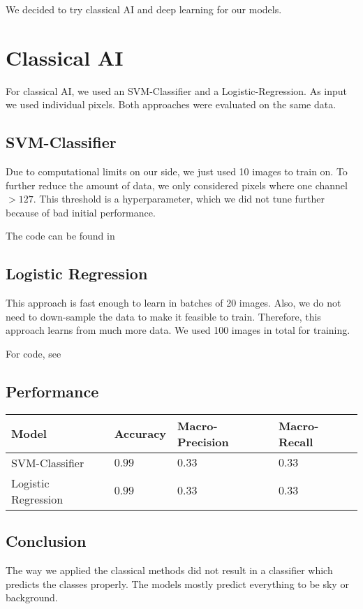 We decided to try classical AI and deep learning for our models.

\section{Classical AI}
For classical AI, we used an SVM-Classifier and a Logistic-Regression. As input we used individual pixels. Both approaches were evaluated on the same data.

\subsection{SVM-Classifier}
Due to computational limits on our side, we just used 10 images to train on. To further reduce the amount of data, we only considered pixels where one channel $>127$. This threshold is a hyperparameter, which we did not tune further because of bad initial performance.

The code can be found in 

\subsection{Logistic Regression}
This approach is fast enough to learn in batches of 20 images. Also, we do not need to down-sample the data to make it feasible to train. Therefore, this approach learns from much more data. We used 100 images in total for training.

For code, see 

\subsection{Performance}
\begin{tabularx}{\linewidth}{mmmm}
    \hline
    Model               & Accuracy & Macro-Precision & Macro-Recall \\
    \hline
    SVM-Classifier      & $0.99$   & $0.33$          & $0.33$       \\
    \hline
    Logistic Regression & $0.99$   & $0.33$          & $0.33$       \\
\end{tabularx}

\subsection{Conclusion}
The way we applied the classical methods did not result in a classifier which predicts the classes properly. The models mostly predict everything to be sky or background.
